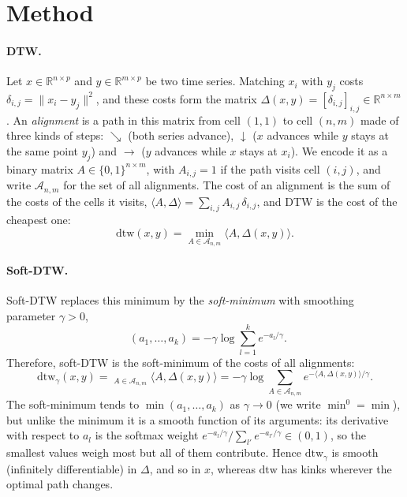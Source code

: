 \documentclass[11pt]{article}
\providecommand{\R}{\mathbb{R}}
\newcommand{\sdtw}{\mathrm{dtw}_\gamma}
\newcommand{\minop}{\mathop{\mathrm{min}^\gamma}}
\begin{document}
\section{Method}

\paragraph{DTW.}
Let $x\in\R^{n\times p}$ and $y\in\R^{m\times p}$ be two time series. Matching $x_i$ with $y_j$ costs $\delta_{i,j}=\|x_i-y_j\|^2$, and these costs form the matrix $\Delta(x,y)=[\delta_{i,j}]_{i,j}\in\R^{n\times m}$. An \emph{alignment} is a path in this matrix from cell $(1,1)$ to cell $(n,m)$ made of three kinds of steps: $\searrow$ (both series advance), $\downarrow$ ($x$ advances while $y$ stays at the same point $y_j$) and $\rightarrow$ ($y$ advances while $x$ stays at $x_i$). We encode it as a binary matrix $A\in\{0,1\}^{n\times m}$, with $A_{i,j}=1$ if the path visits cell $(i,j)$, and write $\mathcal A_{n,m}$ for the set of all alignments. The cost of an alignment is the sum of the costs of the cells it visits, $\langle A,\Delta\rangle=\sum_{i,j}A_{i,j}\,\delta_{i,j}$, and DTW is the cost of the cheapest one:
\begin{equation}
\mathrm{dtw}(x,y)=\min_{A\in\mathcal A_{n,m}}\langle A,\Delta(x,y)\rangle .
\end{equation}

\paragraph{Soft-DTW.}
Soft-DTW replaces this minimum by the \emph{soft-minimum} with smoothing parameter $\gamma>0$,
\begin{equation}
\minop(a_1,\dots,a_k)=-\gamma\log\sum_{l=1}^{k}e^{-a_l/\gamma}.
\end{equation}
Therefore, soft-DTW is the soft-minimum of the costs of all alignments:
\begin{equation}
\sdtw(x,y)=\minop_{A\in\mathcal A_{n,m}}\langle A,\Delta(x,y)\rangle=-\gamma\log\sum_{A\in\mathcal A_{n,m}}e^{-\langle A,\Delta(x,y)\rangle/\gamma}.
\end{equation}
The soft-minimum tends to $\min(a_1,\dots,a_k)$ as $\gamma\to0$ (we write $\min^{0}=\min$), but unlike the minimum it is a smooth function of its arguments: its derivative with respect to $a_l$ is the softmax weight $e^{-a_l/\gamma}/\sum_{l'}e^{-a_{l'}/\gamma}\in(0,1)$, so the smallest values weigh most but all of them contribute. Hence $\sdtw$ is smooth (infinitely differentiable) in $\Delta$, and so in $x$, whereas $\mathrm{dtw}$ has kinks wherever the optimal path changes.
\end{document}
